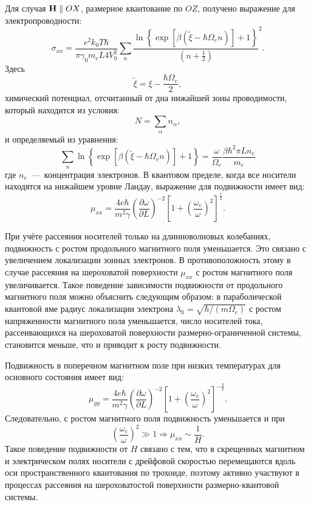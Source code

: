 Для случая $\boldsymbol{\mathbf{H}} \parallel OX$, размерное квантование по $OZ$, получено выражение для электропроводности:
\begin{equation} \label{eq:syn_18}
\sigma_{xx} = \frac{e^2 k_0 T \hbar}{\pi \gamma_0 m_e L 4 V^2_0} \sum_n{\frac{\ln{\left\{\exp{\left[\beta \left(\widetilde{\xi}-\hbar \Omega_e n\right)\right]}+1\right\}}}{\left(n+\frac{1}{2}\right)}^2}. 
\end{equation}
Здесь
\[
\widetilde{\xi} = \xi -\frac{\hbar\Omega_e }{2},
\]
химический потенциал, отсчитанный от дна нижайшей зоны проводимости, который находится из условия:
\begin{equation} \label{eq:syn_19}
N=\sum_{\alpha }{n_{\alpha}},
\end{equation}
и определяемый из уравнения:
\begin{equation} \label{eq:syn_20}
\sum_n{\ln{\left\{\exp{\left[\beta \left(\widetilde{\xi}-\hbar \Omega_e n\right)\right]}+1\right\}}}=\frac{\omega }{\Omega_e } \frac{\beta \hbar^2 \pi L n_e}{m_e}
\end{equation}
где $n_e$~---~концентрация электронов.
В квантовом пределе, когда все носители находятся на нижайшем уровне Ландау, выражение для подвижности имеет вид:
\begin{equation} \label{eq:syn_21}
\mu _{xx} =\frac{4e\hbar }{m^2 \gamma } \left(\frac{\partial \omega }{\partial L} \right)^{-2} \left[1+\left(\frac{\omega_c}{\omega } \right)^2 \right]^{\frac{1}{2} }.
\end{equation}

При учёте рассеяния носителей только на длинноволновых колебаниях, подвижность с ростом продольного магнитного поля уменьшается. Это связано с увеличением локализации зонных электронов. В противоположность этому в случае рассеяния на шероховатой поверхности $\mu_{xx} $ с ростом магнитного поля увеличивается. Такое поведение зависимости подвижности от продольного магнитного поля можно объяснить следующим образом: в параболической квантовой яме радиус локализации электрона $\lambda_0 =\sqrt{\hbar / (m\Omega_e) } $ с ростом напряженности магнитного поля уменьшается, число носителей тока, рассеивающихся на шероховатой поверхности размерно-ограниченной системы, становится меньше, что и приводит к росту подвижности.

Подвижность в поперечном магнитном поле при низких температурах для основного состояния имеет вид:
\begin{equation} \label{eq:syn_22}
\mu_{yy} =\frac{4e\hbar }{m^{2} \gamma } \left(\frac{\partial \omega }{\partial L} \right)^{-2} \left[1+\left(\frac{\omega _{c} }{\omega } \right)^{2} \right]^{-\frac{3}{2} }.
\end{equation}
Следовательно, с ростом магнитного поля подвижность уменьшается и при
\[
\left(\frac{\omega_c}{\omega } \right)^2 \gg 1 \Rightarrow \mu_{xx} \sim \frac{1}{H} .
\]
Такое поведение подвижности от $H$ связано с тем, что в скрещенных магнитном и электрическом полях носители с дрейфовой скоростью перемещаются вдоль оси пространственного квантования по трохоиде, поэтому активно участвуют в процессах рассеяния на шероховатостой поверхности размерно-квантовой системы. 

